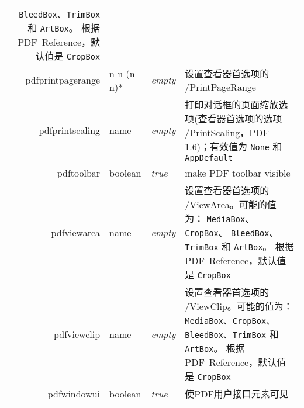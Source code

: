 \documentclass{article}
\begin{document}
\begin{longtable}{@{}>{\ttfamily}r>{\raggedright}p{}>{\itshape}lp{7cm}@{}}
    \verb|BleedBox|、\verb|TrimBox| 和 \verb|ArtBox|。
    根据PDF~Reference，默认值是 \verb|CropBox|                                                                                                                                                                                                                                                             \\
    pdfprintpagerange   & n n (n n)*
                        & empty          & 设置查看器首选项的 /PrintPageRange                                                                                                                                                                                                                                \\
    pdfprintscaling     & name           & empty                     & 打印对话框的页面缩放选项(查看器首选项的选项 /PrintScaling，PDF 1.6)；有效值为 \verb|None| 和 \verb|AppDefault|                                                                                                                                           \\
    pdftoolbar          & boolean        & true                      & make PDF toolbar visible                                                                                                                                                                                                     \\
    pdfviewarea         & name           & empty                     & 设置查看器首选项的 /ViewArea。可能的值为：
    \verb|MediaBox|、\verb|CropBox|、
    \verb|BleedBox|、\verb|TrimBox| 和 \verb|ArtBox|。
    根据PDF~Reference，默认值是 \verb|CropBox|                                                                                                                                                                                                                                                             \\
    pdfviewclip         & name           & empty                     & 设置查看器首选项的 /ViewClip。可能的值为：
    \verb|MediaBox|、\verb|CropBox|、
    \verb|BleedBox|、\verb|TrimBox| 和 \verb|ArtBox|。
    根据PDF~Reference，默认值是 \verb|CropBox|                                                                                                                                                                                                                                                             \\
    pdfwindowui         & boolean        & true                      & 使PDF用户接口元素可见                                                                                                                                                                                                                 \\

\end{longtable}
\end{document}
